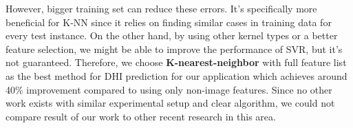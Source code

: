 However, bigger training set can reduce these errors. It's specifically more beneficial for K-NN since it relies on finding similar cases in training data for every test instance. On the other hand, by using other kernel types or a better feature selection, we might be able to improve the performance of SVR, but it's not guaranteed. Therefore, we choose \textbf{K-nearest-neighbor} with full feature list as the best method for DHI prediction for our application which achieves around 40\% improvement compared to using only non-image features. Since no other work exists with similar experimental setup and clear algorithm, we could not compare result of our work to other recent research in this area.
